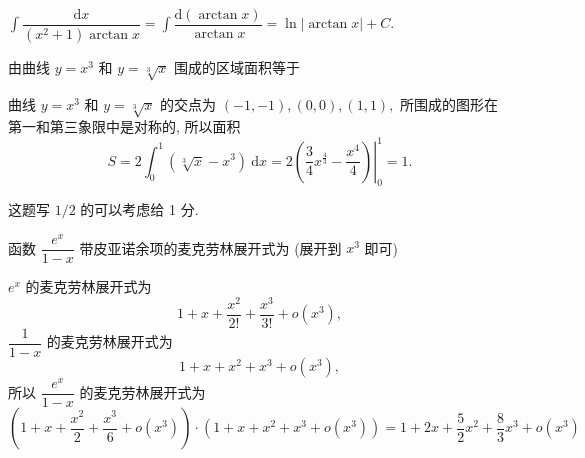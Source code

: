 \begin{solution}
  $\displaystyle \int \dfrac{\mathrm{d}x}{(x^2+1) \arctan x} = \int \dfrac{\mathrm{d} (\arctan x)}{\arctan x} = \ln\lvert \arctan x \rvert + C.$
\end{solution}


\begin{question}
  由曲线 $y = x^3$ 和 $y = \sqrt[3]{x}$ 围成的区域面积等于 \fillin[$1$]
\end{question}

\begin{solution}
  曲线 $y = x^3$ 和 $y = \sqrt[3]{x}$ 的交点为 $(-1, -1), (0, 0), (1, 1),$ 所围成的图形在第一和第三象限中是对称的, 所以面积
  $$S = 2\int_0^1 (\sqrt[3]{x} - x^3) ~ \mathrm{d}x = 2 \left. \left(\dfrac{3}{4}x^{\frac{4}{3}} - \dfrac{x^4}{4} \right) \right|_0^1 = 1.$$

  这题写 $1/2$ 的可以考虑给 1 分.
\end{solution}





\begin{question}
  函数 $\dfrac{e^{x}}{1-x}$ 带皮亚诺余项的麦克劳林展开式为 (展开到 $x^3$ 即可) 
\end{question}

\begin{solution}
$e^{x}$ 的麦克劳林展开式为
$$1 + x + \dfrac{x^2}{2!} + \dfrac{x^3}{3!} + o(x^3),$$
$\dfrac{1}{1-x}$ 的麦克劳林展开式为
$$1 + x + x^2 + x^3 + o(x^3),$$
所以 $\dfrac{e^{x}}{1-x}$ 的麦克劳林展开式为
\begin{equation*}
(1 + x + \dfrac{x^2}{2} + \dfrac{x^3}{6} + o(x^3)) \cdot (1 + x + x^2 + x^3 + o(x^3)) = 1 + 2x + \dfrac{5}{2} x^2 + \dfrac{8}{3} x^3 + o(x^3)
\end{equation*}
\end{solution}

